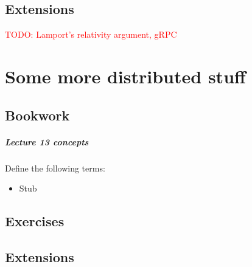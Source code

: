 \documentclass[12pt,a4paper,oneside,openright]{report}
\newcommand{\question}[2]{\paragraph{#1} #2}
\newcommand{\todo}[1]{\textcolor{red}{TODO: #1}}
\begin{document}
\section{Extensions}

\todo{Lamport's relativity argument, gRPC}

\chapter{Some more distributed stuff}

\section{Bookwork}

\question{Lecture 13 concepts}{Define the following terms:
  \begin{multicols}{2}
    \begin{itemize}
    \item Stub
    \end{itemize}
  \end{multicols}
}

\section{Exercises}

\section{Extensions}




\end{document}
